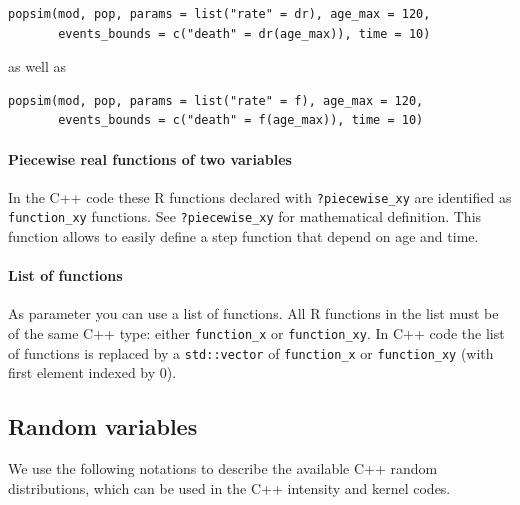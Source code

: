 \begin{verbatim}
popsim(mod, pop, params = list("rate" = dr), age_max = 120, 
       events_bounds = c("death" = dr(age_max)), time = 10)
\end{verbatim}

as well as

\begin{verbatim}
popsim(mod, pop, params = list("rate" = f), age_max = 120, 
       events_bounds = c("death" = f(age_max)), time = 10)
\end{verbatim}

\hypertarget{piecewise-real-functions-of-two-variables}{%
\paragraph{Piecewise real functions of two variables}\label{piecewise-real-functions-of-two-variables}}

In the C++ code these R functions declared with \texttt{?piecewise\_xy} are identified as \texttt{function\_xy} functions. See \texttt{?piecewise\_xy} for mathematical definition. This function allows to easily define a step function that depend on age and time.

\hypertarget{list-of-functions}{%
\paragraph{List of functions}\label{list-of-functions}}

As parameter you can use a list of functions. All R functions in the list must be of the same C++ type: either \texttt{function\_x} or \texttt{function\_xy}. In C++ code the list of functions is replaced by a \texttt{std::vector} of \texttt{function\_x} or \texttt{function\_xy} (with first element indexed by 0).

\hypertarget{randomvar}{%
\subsection{Random variables}\label{randomvar}}

We use the following notations to describe the available C++ random distributions, which can be used in the C++ intensity and kernel codes.

